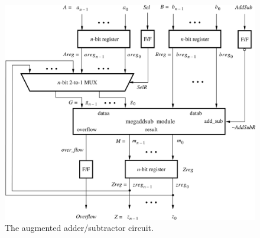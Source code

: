 \documentclass[11pt, twoside, pdftex]{article}
\begin{document}
\begin{figure}[H]
   \begin{center}
      \includegraphics[scale=0.9]{figures/figure3.png}
   \caption{The augmented adder/subtractor circuit.} 
	 \label{fig:3}
	 \end{center}
\end{figure}  
\end{document}
